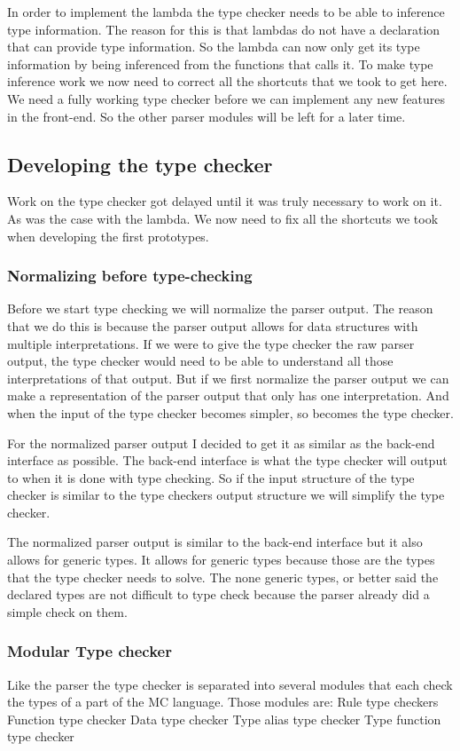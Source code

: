 In order to implement the lambda the type checker needs to be able to inference type information. The reason for this is that lambdas do not have a declaration that can provide type information. So the lambda can now only get its type information by being inferenced from the functions that calls it. To make type inference work we now need to correct all the shortcuts that we took to get here. We need a fully working type checker before we can implement any new features in the front-end. So the other parser modules will be left for a later time.

\subsection{Developing the type checker}
Work on the type checker got delayed until it was truly necessary to work on it. As was the case with the lambda. We now need to fix all the shortcuts we took when developing the first prototypes.

\subsubsection{Normalizing before type-checking}
Before we start type checking we will normalize the parser output. The reason that we do this is because the parser output allows for data structures with multiple interpretations. If we were to give the type checker the raw parser output, the type checker would need to be able to understand all those interpretations of that output. But if we first normalize the parser output we can make a representation of the parser output that only has one interpretation. And when the input of the type checker becomes simpler, so becomes the type checker.

For the normalized parser output I decided to get it as similar as the back-end interface as possible. The back-end interface is what the type checker will output to when it is done with type checking. So if the input structure of the type checker is similar to the type checkers output structure we will simplify the type checker.

The normalized parser output is similar to the back-end interface but it also allows for generic types. It allows for generic types because those are the types that the type checker needs to solve. The none generic types, or better said the declared types are not difficult to type check because the parser already did a simple check on them. 

\subsubsection{Modular Type checker}
Like the parser the type checker is separated into several modules that each check the types of a part of the MC language. Those modules are:
	Rule type checkers
	Function type checker
	Data type checker
	Type alias type checker
	Type function type checker








